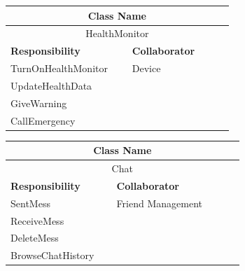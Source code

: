 \documentclass[a4paper]{article}
\begin{document}
	\noindent\begin{minipage}{\textwidth}
		\begin{minipage}[t]{0.48\textwidth}
		\centering
		\makeatletter{}\makeatother\caption*{}
			\begin{tabular}{|p{0.48\linewidth}|p{0.40\linewidth}|} 
				\hline
				\multicolumn{2}{|c|}{\textbf{Class Name}} \\
				\hline
				\multicolumn{2}{|c|}{HealthMonitor} \\
				\hline
				\textbf{Responsibility} & \textbf{Collaborator} \\
				\hline
				TurnOnHealthMonitor & Device\\
				UpdateHealthData & \\
				GiveWarning & \\
				CallEmergency &\\
				\hline
			\end{tabular}
		\end{minipage}
		\begin{minipage}[t]{0.48\textwidth}
		\centering
		\makeatletter{}\makeatother\caption*{}
			\begin{tabular}{|p{0.40\linewidth}|p{0.48\linewidth}|} 
				\hline
				\multicolumn{2}{|c|}{\textbf{Class Name}} \\
				\hline
				\multicolumn{2}{|c|}{Chat} \\
				\hline
				\textbf{Responsibility} & \textbf{Collaborator} \\
				\hline
				SentMess& Friend Management\\
				ReceiveMess& \\
				DeleteMess& \\
				BrowseChatHistory &\\
				\hline
			\end{tabular}
		\end{minipage}
   	\end{minipage}
\end{document}
